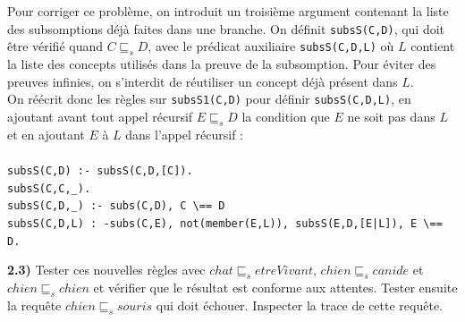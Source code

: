 \documentclass[a4paper,12pt]{report}
\begin{document}

\newpage

Pour corriger ce problème, on introduit un troisième argument contenant la liste des subsomptions déjà faites dans une branche. On définit \texttt{subsS(C,D)},
    qui doit être vérifié quand \(C \sqsubseteq_s D\), avec le prédicat auxiliaire \texttt{subsS(C,D,L)} où \(L\) contient la liste des concepts utilisés
    dans la preuve de la subsomption. Pour éviter des preuves infinies, on s'interdit de réutiliser un concept déjà présent dans \(L\).\\

On réécrit donc les règles sur \texttt{subsS1(C,D)} pour définir \texttt{subsS(C,D,L)}, en ajoutant avant tout appel récursif \(E \sqsubseteq_s D\)
    la condition que \(E\) ne soit pas dans \(L\) et en ajoutant \(E\) à \(L\) dans l'appel récursif :\\\\
\texttt{subsS(C,D) :- subsS(C,D,[C]).}\\
\texttt{subsS(C,C,\_).}\\
\texttt{subsS(C,D,\_) :- subs(C,D), C \textbackslash== D}\\
\texttt{subsS(C,D,L) : -subs(C,E), not(member(E,L)), subsS(E,D,[E|L]), E \textbackslash== D.}\\



\vspace{0.5cm}

{}



\textbf{2.3)} Tester ces nouvelles règles avec \(chat \sqsubseteq_s etreVivant\), \(chien \sqsubseteq_s canide\) et \(chien \sqsubseteq_s chien\) et
    vérifier que le résultat est conforme aux attentes. Tester ensuite la requête \(chien \sqsubseteq_s souris\) qui doit échouer. Inspecter la trace
    de cette requête.
\end{document}
